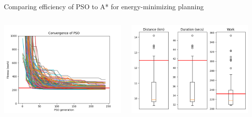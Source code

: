 \documentclass[9pt,xcolor=table]{beamer}
\begin{document}
\begin{frame}{Comparing efficiency of PSO to A* for energy-minimizing planning}
\begin{columns}
        \begin{column}{0.5\textwidth}
            \includegraphics[width=\textwidth,trim={0cm 0cm 0cm 0cm},clip]{img/FP1_convergence.png}
        \end{column}
        \begin{column}{0.5\textwidth}
            \includegraphics[width=\textwidth,trim={0cm 0cm 0cm 0cm},clip]{img/FP1_box.png}
        \end{column}
    \end{columns}
\end{frame}
\end{document}

